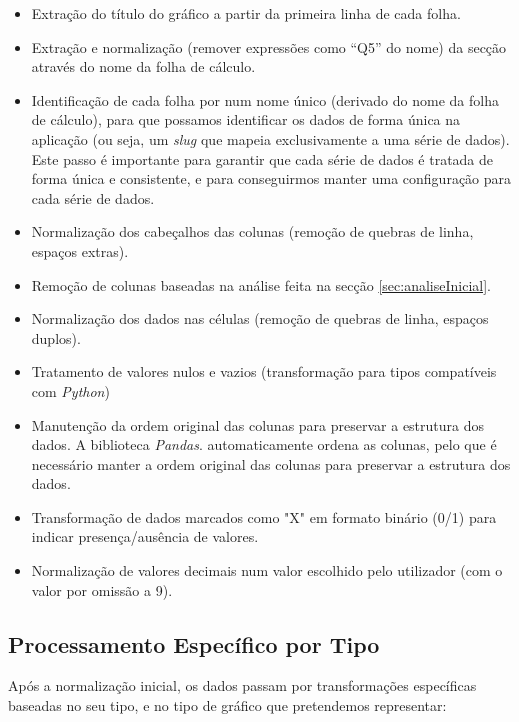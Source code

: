 \begin{itemize}
    \item Extração do título do gráfico a partir da primeira linha de cada folha.
    \item Extração e normalização (remover expressões como ``Q5'' do nome) da secção através do nome da folha de cálculo.
    \item Identificação de cada folha por num nome único (derivado do nome da folha de cálculo), para que possamos identificar os dados de forma única na aplicação (ou seja, um \textit{slug} que mapeia exclusivamente a uma série de dados). Este passo é importante para garantir que cada série de dados é tratada de forma única e consistente, e para conseguirmos manter uma configuração para cada série de dados.
    \item Normalização dos cabeçalhos das colunas (remoção de quebras de linha, espaços extras).
    \item Remoção de colunas baseadas na análise feita na secção \ref{sec:analiseInicial}.
    \item Normalização dos dados nas células (remoção de quebras de linha, espaços duplos).
    \item Tratamento de valores nulos e vazios (transformação para tipos compatíveis com \textit{Python})
    \item Manutenção da ordem original das colunas para preservar a estrutura dos dados. A biblioteca \textit{Pandas}. automaticamente ordena as colunas, pelo que é necessário manter a ordem original das colunas para preservar a estrutura dos dados.
    \item Transformação de dados marcados como "X" em formato binário (0/1) para indicar presença/ausência de valores.
    \item Normalização de valores decimais num valor escolhido pelo utilizador (com o valor por omissão a 9).
\end{itemize}

\subsection{Processamento Específico por Tipo}

Após a normalização inicial, os dados passam por transformações específicas baseadas no seu tipo, e no tipo de gráfico que pretendemos representar:

